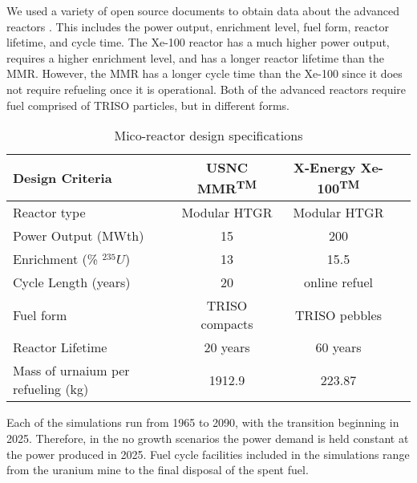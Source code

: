 We used a variety of open source documents to obtain data about the advanced reactors
\cite{harlan_x-energy_2018, hussain_advances_2018, mitchell_usnc_2020}. This includes 
the power output, enrichment level, fuel form, reactor lifetime, and cycle time. 
The Xe-100 reactor has a much higher power output, requires a higher enrichment 
level, and has a longer reactor lifetime than the \gls{MMR}. However, the 
\gls{MMR} has a longer cycle time than the Xe-100 since it does not require 
refueling once it is operational. Both of the advanced reactors require fuel 
comprised of \gls{TRISO} particles, but in different forms. 

\begin{table}[ht]
        \caption{Mico-reactor design specifications}
        \label{tab:reactor_summary}
        \begin{tabular}{l c c c}
            \hline
            Design Criteria & \gls{USNC} \gls{MMR}\textsuperscript{TM} & 
                X-Energy Xe-100\textsuperscript{TM} \\\hline
            Reactor type & Modular HTGR & Modular HTGR \\
            Power Output (MWth) & 15 & 200 \\
            Enrichment (\% $^{235}U$) & 13 & 15.5 \\
            Cycle Length (years) & 20 & online refuel\\
            Fuel form & \gls{TRISO} compacts & \gls{TRISO} pebbles\\
            Reactor Lifetime & 20 years & 60 years \\
            Mass of urnaium per refueling (kg) & 1912.9& 223.87 \\
            \hline
        \end{tabular}
    \end{table}

Each of the simulations run from 1965 to 2090, with the transition beginning 
in 2025. Therefore, in the no growth scenarios the power demand is held constant 
at the power produced in 2025. Fuel cycle facilities included in the simulations
range from the uranium mine to the final disposal of the spent fuel. 